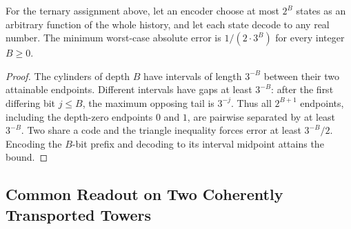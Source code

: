 \begin{proposition}\label{prop:ternary-arbitrary-code}
For the ternary assignment above, let an encoder choose at most $2^B$ states as an arbitrary function of the whole history, and let each state decode to any real number. The minimum worst-case absolute error is $1/(2\cdot3^B)$ for every integer $B\geq0$.
\end{proposition}
\begin{proof}
The cylinders of depth $B$ have intervals of length $3^{-B}$ between their two attainable endpoints. Different intervals have gaps at least $3^{-B}$: after the first differing bit $j\leq B$, the maximum opposing tail is $3^{-j}$. Thus all $2^{B+1}$ endpoints, including the depth-zero endpoints $0$ and $1$, are pairwise separated by at least $3^{-B}$. Two share a code and the triangle inequality forces error at least $3^{-B}/2$. Encoding the $B$-bit prefix and decoding to its interval midpoint attains the bound.
\end{proof}

\subsection{Common Readout on Two Coherently Transported Towers}

